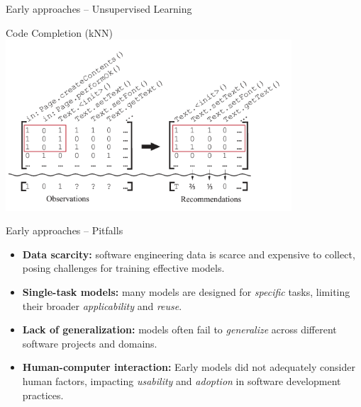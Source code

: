 \documentclass[presentation, 10pt]{beamer}\mode<presentation>{\usetheme{AMSBolognaFC}}
\begin{document}
\begin{frame}{Early approaches -- Unsupervised Learning}
\begin{exampleblock}{Code Completion (kNN)~\cite{DBLP:conf/sigsoft/BruchMM09}}
\centering
\includegraphics[width=0.8\textwidth]{img/code-completions.png}
\end{exampleblock}
\end{frame}
\begin{frame}{Early approaches -- Pitfalls}
	\begin{itemize}
		\item \textbf{Data scarcity:} software engineering data is scarce and expensive to collect, posing challenges for training effective models.
		\item \textbf{Single-task models:} many models are designed for \emph{specific} tasks, limiting their broader \emph{applicability} and \emph{reuse}.
		\item \textbf{Lack of generalization:} models often fail to \emph{generalize} across different software projects and domains.
		\item \textbf{Human-computer interaction:} Early models did not adequately consider human factors, impacting \emph{usability} and \emph{adoption} in software development practices.
	\end{itemize}
\end{frame}
\end{document}
